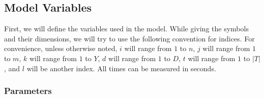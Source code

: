 \documentclass{article}
\begin{document}
\subsection{Model Variables}

First, we will define the variables used in the model.
While giving the symbols and their dimensions, we will try to use the following convention for indices.
For convenience, unless otherwise noted, 
$i$ will range from $1$ to $n$,
$j$ will range from $1$ to $m$,
$k$ will range from $1$ to $Y$,
$d$ will range from $1$ to $D$,
$t$ will range from $1$ to $|T|$,
and $l$ will be another index.
All times can be measured in seconds.



\subsubsection{Parameters}
\end{document}
